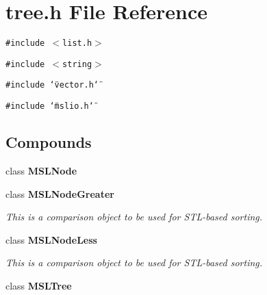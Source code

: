 \section{tree.h File Reference}
\label{tree_8h}
{\tt \#include $<$list.h$>$}\par
{\tt \#include $<$string$>$}\par
{\tt \#include \char`\"{}vector.h\char`\"{}}\par
{\tt \#include \char`\"{}mslio.h\char`\"{}}\par
\subsection*{Compounds}
\begin{CompactItemize}
\item 
class {\bf MSLNode}
\item 
class {\bf MSLNode\-Greater}
\begin{CompactList}\small\item\em This is a comparison object to be used for STL-based sorting.\item\end{CompactList}\item 
class {\bf MSLNode\-Less}
\begin{CompactList}\small\item\em This is a comparison object to be used for STL-based sorting.\item\end{CompactList}\item 
class {\bf MSLTree}
\end{CompactItemize}
